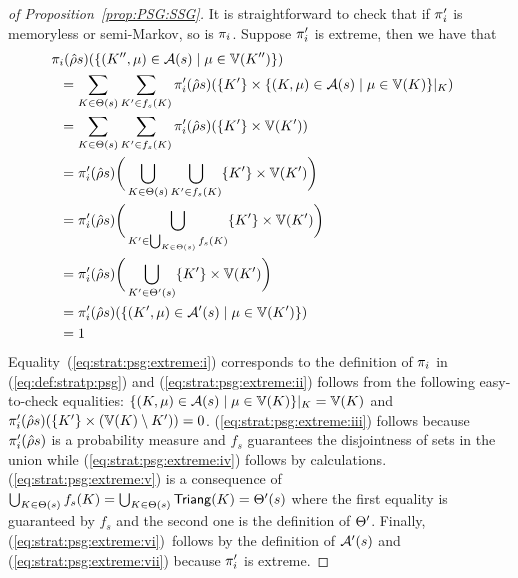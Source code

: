 \begin{proof}[of Proposition~\ref{prop:PSG:SSG}]
  It is straightforward to check that if $\pi'_{i}$ is memoryless or
  semi-Markov, so is $\pi_{i}$.  Suppose $\pi'_{i}$ is extreme,
  then we have that
  \begin{align}
    \strat_{i}(\hat{\rho}s)(\{(K'',\mu)\in\sgactions(s)\mid\mu\in\vertices(K'')\})\hspace{-16em}
    \notag\\
    & =
    \sum_{K\in\psgtrans(s)} \sum_{K'\in f_{s}(K)} \strat'_{i}(\hat{\rho}s)(\{K'\}\times{\{(K,\mu)\in\sgactions(s)\mid\mu\in\vertices(K)\}\sect{K}})
    \label{eq:strat:psg:extreme:i}\\
    & =
    \sum_{K\in\psgtrans(s)} \sum_{K'\in f_{s}(K)} \strat'_{i}(\hat{\rho}s)(\{K'\}\times\vertices(K'))
    \label{eq:strat:psg:extreme:ii}\\
    & =
    \strat'_{i}(\hat{\rho}s)\bigg(\bigcup_{K\in\psgtrans(s)}\bigcup_{K'\in f_{s}(K)} \{K'\}\times\vertices(K')\bigg)
    \label{eq:strat:psg:extreme:iii}\\
    & =
    \strat'_{i}(\hat{\rho}s)\bigg(\bigcup_{K'\in\bigcup_{K\in\psgtrans(s)}f_{s}(K)} \{K'\}\times\vertices(K')\bigg)
    \label{eq:strat:psg:extreme:iv}\\
    & =
    \strat'_{i}(\hat{\rho}s)\bigg(\bigcup_{K'\in\psgtrans'(s)} \{K'\}\times\vertices(K')\bigg)
    \label{eq:strat:psg:extreme:v}\\
    & =
    \strat'_{i}(\hat{\rho}s)(\{(K',\mu)\in\sgactions'(s)\mid\mu\in\vertices(K')\})
    \label{eq:strat:psg:extreme:vi}\\
    & =
    1
    \label{eq:strat:psg:extreme:vii}
  \end{align}
  Equality~(\ref{eq:strat:psg:extreme:i}) corresponds to the
  definition of $\pi_{i}$ in (\ref{eq:def:stratp:psg}) and
  (\ref{eq:strat:psg:extreme:ii}) follows from the following
  easy-to-check equalities:
  ${\{(K,\mu)\in\mathcal{A}(s)\mid\mu\in\mathbb{V}(K)\}{|_{K}}} =
  \mathbb{V}(K)$ and
  $\pi'_{i}(\hat{\rho}s)(\{K'\}\times(\mathbb{V}(K)\setminus{K'}))=0$.
  (\ref{eq:strat:psg:extreme:iii}) follows because
  $\pi'_{i}(\hat{\rho}s)$ is a probability measure and $f_s$
  guarantees the disjointness of sets in the union while
  (\ref{eq:strat:psg:extreme:iv}) follows by calculations.
  (\ref{eq:strat:psg:extreme:v}) is a consequence of
  $\bigcup_{K\in\Theta(s)}f_{s}(K)=\bigcup_{K\in\Theta(s)}\mathsf{Triang}(K)=\Theta'(s)$
  where the first equality is guaranteed by $f_{s}$ and the second one
  is the definition of $\Theta'$.
  Finally, (\ref{eq:strat:psg:extreme:vi})~follows by the definition
  of $\mathcal{A}'(s)$ and (\ref{eq:strat:psg:extreme:vii}) because
  $\pi'_{i}$ is extreme.


\end{proof}
